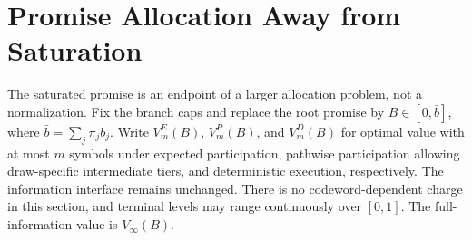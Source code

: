 \section{Promise Allocation Away from Saturation}\label{sec:promise}
The saturated promise is an endpoint of a larger allocation problem, not a normalization. Fix the branch caps and replace the root promise by $B\in[0,\bar b]$, where $\bar b=\sum_j\pi_jb_j$. Write $V_m^E(B)$, $V_m^P(B)$, and $V_m^D(B)$ for optimal value with at most $m$ symbols under expected participation, pathwise participation allowing draw-specific intermediate tiers, and deterministic execution, respectively. The information interface remains unchanged. There is no codeword-dependent charge in this section, and terminal levels may range continuously over $[0,1]$. The full-information value is $V_\infty(B)$.

